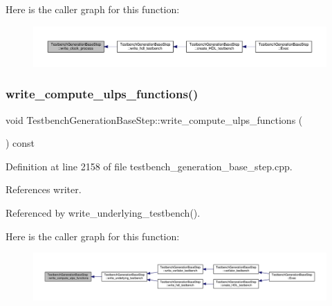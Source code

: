 Here is the caller graph for this function\+:
\nopagebreak
\begin{figure}[H]
\begin{center}
\leavevmode
\includegraphics[width=350pt]{dc/d02/classTestbenchGenerationBaseStep_a96a147c621c5aa82d4a87ef81b4b5c06_icgraph}
\end{center}
\end{figure}
\mbox{\label{classTestbenchGenerationBaseStep_a5b8923d72a57f276c4a739775e2ef707}} 
\subsubsection{\texorpdfstring{write\+\_\+compute\+\_\+ulps\+\_\+functions()}{write\_compute\_ulps\_functions()}}
{\footnotesize\ttfamily void Testbench\+Generation\+Base\+Step\+::write\+\_\+compute\+\_\+ulps\+\_\+functions (\begin{DoxyParamCaption}{ }\end{DoxyParamCaption}) const\hspace{0.3cm}{\ttfamily [protected]}}



Definition at line 2158 of file testbench\+\_\+generation\+\_\+base\+\_\+step.\+cpp.



References writer.



Referenced by write\+\_\+underlying\+\_\+testbench().

Here is the caller graph for this function\+:
\nopagebreak
\begin{figure}[H]
\begin{center}
\leavevmode
\includegraphics[width=350pt]{dc/d02/classTestbenchGenerationBaseStep_a5b8923d72a57f276c4a739775e2ef707_icgraph}
\end{center}
\end{figure}
\mbox{\label{classTestbenchGenerationBaseStep_abebc101901191b2ee6732df8c9ecc9ee}} 
